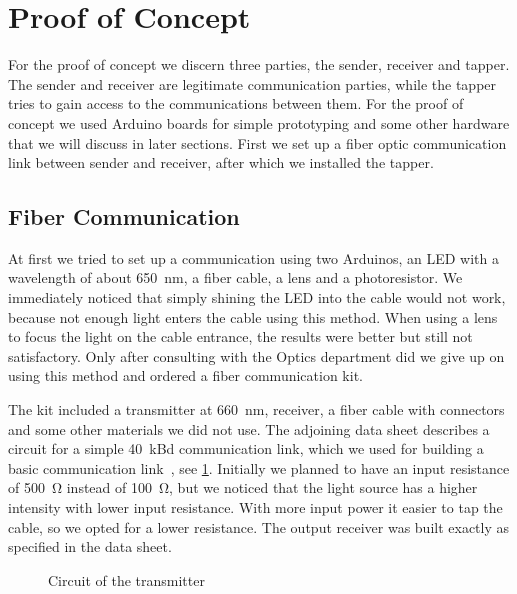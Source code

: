 \documentclass[11pt,twoside,a4paper]{scrartcl}
\begin{document}
\section{Proof of Concept}
	For the proof of concept we discern three parties, the sender, receiver and tapper.
	The sender and receiver are legitimate communication parties,
	while the tapper tries to gain access to the communications between them.
	For the proof of concept we used Arduino boards for simple prototyping and some other hardware
	that we will discuss in later sections.
	First we set up a fiber optic communication link between sender and receiver,
	after which we installed the tapper.

	\subsection{Fiber Communication}
		At first we tried to set up a communication using two Arduinos, an LED with a wavelength of about \SI{650}{\nano\meter},
		a fiber cable, a lens and a photoresistor.
		We immediately noticed that simply shining the LED into the cable would not work,
		because not enough light enters the cable using this method.
		When using a lens to focus the light on the cable entrance,
		the results were better but still not satisfactory.
		Only after consulting with the Optics department did we give up on using this method
		and ordered a fiber communication kit.

		The kit included a transmitter at \SI{660}{\nano\meter}, receiver, a fiber cable with connectors and some other materials we did not use.
		The adjoining data sheet describes a circuit for a simple \SI{40}{\kilo Bd} communication link,
		which we used for building a basic communication link~\cite[p.15]{avagokit},
		see \cref{fig:transmitter}.
		Initially we planned to have an input resistance of \SI{500}{\ohm} instead of \SI{100}{\ohm},
		but we noticed that the light source has a higher intensity with lower input resistance.
		With more input power it easier to tap the cable, so we opted for a lower resistance.
		The output receiver was built exactly as specified in the data sheet.

		\begin{figure}
			\centering
			\caption{Circuit of the transmitter}
			\label{fig:transmitter}
		\end{figure}
\end{document}
